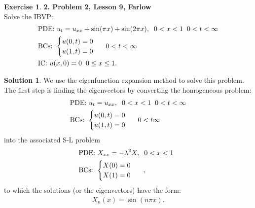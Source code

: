 \documentclass{article}
\theoremstyle{definition}
\newtheorem*{exer*}{Exercise}
\newtheorem*{sln*}{Solution}
\begin{document}
\begin{exer*}\textbf{2. Problem 2, Lesson 9, Farlow}\\
	Solve the IBVP:
	\begin{align*}
	&\text{PDE: } u_t = u_{xx} + \sin(\pi x) + \sin(2\pi x), \hspace{0.2cm} 0 < x < 1\hspace{0.2cm} 0 < t < \infty\\
	&\text{BCs: }\begin{cases}
	u(0,t) = 0\\
	u(1,t) = 0
	\end{cases}\hspace{0.2cm} 0 < t < \infty\\
	&\text{IC: }u(x,0) = 0\hspace{0.2cm}0\leq x\leq 1.
	\end{align*}
	
	\begin{sln*}
		We use the eigenfunction expansion method to solve this problem. The first step is finding the eigenvectors by converting the homogeneous problem:
		\begin{align*}
		&\text{PDE: } u_t = u_{xx}, \hspace{0.2cm} 0 < x < 1\hspace{0.2cm} 0 < t < \infty\\
		&\text{BCs: }\begin{cases}
		u(0,t) = 0\\
		u(1,t) = 0
		\end{cases}\hspace{0.2cm} 0 < t  \infty
		\end{align*}
		into the associated S-L problem 
		\begin{align*}
		&\text{PDE: } X_{xx} = -\lambda^2 X, \hspace{0.2cm} 0 < x < 1\hspace{0.2cm}\\
		&\text{BCs: }\begin{cases}
		X(0) = 0\\
		X(1) = 0
		\end{cases}\hspace{0.2cm},
		\end{align*}
		to which the solutions (or the eigenvectors) have the form:
		\begin{align*}
		X_n(x) = \sin(n\pi x).
		\end{align*}
		

\end{sln*}
\end{exer*}
\end{document}
